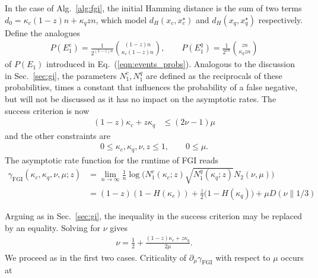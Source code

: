 \documentclass[a4paper,aps,floatfix]{revtex4}
\begin{document}
In the case of Alg.~\ref{alg:fgi}, the initial Hamming distance is the sum of two terms $d_0 =  \kappa_c (1-z)n + \kappa_q z n$, which model $d_H(x_c,x_c^\star)$ and $d_H(x_q,x_q^\star)$ respectively.
Define the analogues 
\begin{align*}
	P(E_1^c) = \frac{1}{2^{(1-z)n}}\binom{(1-z)n}{\kappa_c (1-z)n},
	\qquad
	P(E_1^q) = \frac{1}{2^{z n}}\binom{z n}{\kappa_q  zn}
\end{align*}
of $P(E_1)$ introduced in Eq.~(\ref{eqn:events_probs}).
Analogous to the discussion in Sec.~\ref{sec:gi}, the parameters $N_1^c, N_1^q$ are defined as the reciprocals of these probabilities, times a constant that influences the probability of a false negative, but will not be discussed as it has no impact on the asymptotic rates.
The success criterion is now
\begin{align*}
	(1-z)\kappa_c + z\kappa_q &\leq (2\nu-1)\mu
\end{align*}
and the other constraints are
\begin{align*}
		0 \le \kappa_c, \kappa_q, \nu, z \le 1, 
		\qquad
		0 \le \mu.
\end{align*}
The asymptotic rate function for the runtime of FGI reads
\begin{align}
    \gamma_{\textrm{FGI}}(\kappa_c,\kappa_q,\nu,\mu;z) 
		&= \lim_{n\rightarrow \infty} \frac1n\log\Big(N_1^c(\kappa_c;z)\sqrt{N_1^q(\kappa_q;z)}N_2(\nu,\mu)\Big) \nonumber\\
    &= (1-z)\left(1- H(\kappa_c)\right) + \frac z2\big(1- H(\kappa_q)\big) + \mu D(\nu \parallel 1/3)
\end{align}


Arguing as in Sec.~\ref{sec:gi}, the inequality in the success criterion may be replaced by an equality.
Solving for $\nu$ gives
\begin{align*}
	\nu= \frac12 + \frac{(1-z)\kappa_c + z\kappa_q}{2\mu}.
\end{align*}
We proceed as in the first two cases. 
Criticality of $\partial_{\mu}\gamma_{\textrm{FGI}}$ with respect to $\mu$ occurs at
\end{document}
